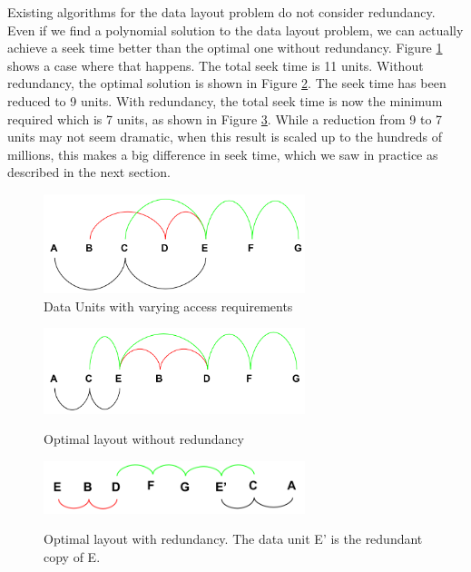 \documentclass[conference]{acmsiggraph}
\begin{document}
Existing algorithms for the data layout problem do not consider redundancy. Even if we find a polynomial solution to the data layout problem, we can actually achieve a seek time better than the optimal one without redundancy. Figure \ref{fig:startingProb} shows a case where that happens. The total seek time is 11 units. Without redundancy, the optimal solution is shown in Figure \ref{woRedundacy}. The seek time has been reduced to 9 units. With redundancy, the total seek time is now the minimum required which is 7 units, as shown in Figure \ref{withRedundancy}. While a reduction from 9 to 7 units may not seem dramatic, when this result is scaled up to the hundreds of millions, this makes a big difference in seek time, which we saw in practice as described in the next section.\\

\begin{figure}[ht]
\centering
\includegraphics[width=3in]{examplePic_startingProblem.png}
\caption{Data Units with varying access requirements}
\label{fig:startingProb}
\end{figure}

\begin{figure}[ht]
\centering
\includegraphics[width=3in]{examplePic_woRedundancy.png}
\label{woRedundacy}
\caption{Optimal layout without redundancy}
\end{figure}

\begin{figure}[ht]
\centering
\includegraphics[width=3in]{examplePic_withRedundancy.png}
\label{withRedundancy}
\caption{Optimal layout with redundancy. The data unit E' is the redundant copy of E.}
\end{figure} 
\end{document}
